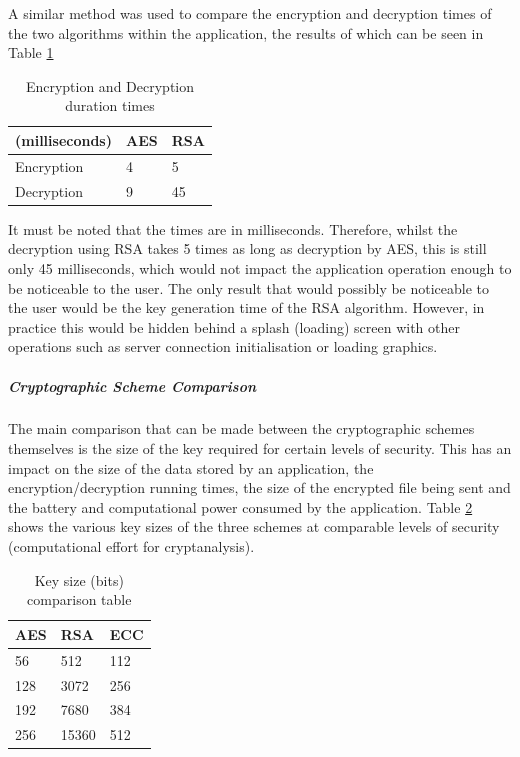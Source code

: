 \documentclass[a4paper,12pt]{report}
\begin{document}
A similar method was used to compare the encryption and decryption times of the two algorithms within the application, the results of which can be seen in Table \ref{tab:ende}

\begin{table}[htb]
\begin{center}
    \begin{tabular}{| l | l | l | }
    \hline
     (milliseconds) & \textbf{AES} & \textbf{RSA}\\ \hline
    Encryption & 4 & 5 \\ \hline
    Decryption & 9 & 45 \\
    \hline
    \end{tabular}
   \caption{Encryption and Decryption duration times}
    \label{tab:ende}
\end{center}
\end{table}

It must be noted that the times are in milliseconds. Therefore, whilst the decryption using RSA takes 5 times as long as decryption by AES, this is still only 45 milliseconds, which would not impact the application operation enough to be noticeable to the user. The only result that would  possibly be noticeable to the user would be the key generation time of the RSA algorithm. However, in practice this would be hidden behind a splash (loading) screen with other operations such as server connection initialisation or loading graphics. 

\subparagraph{Cryptographic Scheme Comparison}

The main comparison that can be made between the cryptographic schemes themselves is the size of the key required for certain levels of security. This has an impact on the size of the data stored by an application, the encryption/decryption running times, the size of the encrypted file being sent and the battery and computational power consumed by the application. Table \ref{tab:keysize} shows the various key sizes of the three schemes at comparable levels of security (computational effort for cryptanalysis).

\begin{table}[htb]
\begin{center}
    \begin{tabular}{| l | l | l | }
    \hline
     \textbf{AES} & \textbf{RSA} & \textbf{ECC}\\ \hline
    56 & 512 & 112 \\ \hline
    128 & 3072 & 256 \\ \hline	
    192 & 7680 & 384 \\ \hline
    256 & 15360 & 512 \\
    \hline
    \end{tabular}
   \caption{Key size (bits) comparison table}
    \label{tab:keysize}
\end{center}
\end{table}
\end{document}
